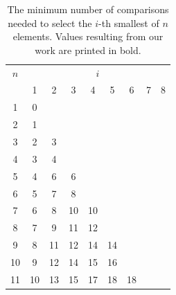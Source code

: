 \documentclass[twoside,leqno,twocolumn]{article}
\begin{document}
\begin{table}[!t]
  \renewcommand{\arraystretch}{1.1}
  \caption{The minimum number of comparisons needed to select the $i$-th smallest of $n$ elements.
    Values resulting from our work are printed in bold.}
  \label{table:num-comparisons}
  \centering
  \small
  \begin{tabular}{c|cccccccc}
    $n$ & \multicolumn{8}{c}{$i$}                                                                                                    \\
        & 1                       & 2  & 3           & 4           & 5           & 6           & 7                & 8                \\ \hline
    1   & 0                                                                                                                          \\
    2   & 1                                                                                                                          \\
    3   & 2                       & 3                                                                                                \\
    4   & 3                       & 4                                                                                                \\
    5   & 4                       & 6  & 6                                                                                           \\
    6   & 5                       & 7  & 8                                                                                           \\
    7   & 6                       & 8  & 10          & 10                                                                            \\
    8   & 7                       & 9  & 11          & 12                                                                            \\
    9   & 8                       & 11 & 12          & 14          & 14                                                              \\
    10  & 9                       & 12 & 14          & 15          & 16                                                              \\
    11  & 10                      & 13 & 15          & 17          & 18          & 18                                                \\

\end{tabular}
\end{table}
\end{document}
